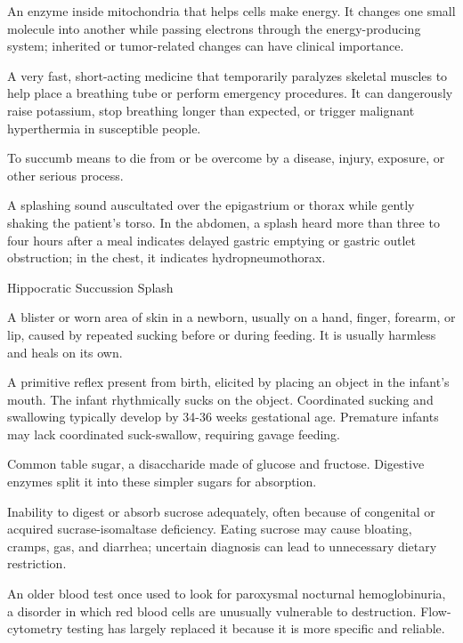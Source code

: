  An enzyme inside mitochondria that helps cells make energy. It changes one small molecule into another while passing electrons through the energy-producing system; inherited or tumor-related changes can have clinical importance.

 A very fast, short-acting medicine that temporarily paralyzes skeletal muscles to help place a breathing tube or perform emergency procedures. It can dangerously raise potassium, stop breathing longer than expected, or trigger malignant hyperthermia in susceptible people.

 To succumb means to die from or be overcome by a disease, injury, exposure, or other serious process.

 A splashing sound auscultated over the epigastrium or thorax while gently shaking the patient's torso. In the abdomen, a splash heard more than three to four hours after a meal indicates delayed gastric emptying or gastric outlet obstruction; in the chest, it indicates hydropneumothorax.

\synonyms
Hippocratic Succussion Splash

 A blister or worn area of skin in a newborn, usually on a hand, finger, forearm, or lip, caused by
repeated sucking before or during feeding. It is usually harmless and heals on its own.

 A primitive reflex present from birth, elicited by placing an object in the infant's
mouth. The infant rhythmically sucks on the object. Coordinated sucking and swallowing
typically develop by 34-36 weeks gestational age. Premature infants may lack coordinated
suck-swallow, requiring gavage feeding.

 Common table sugar, a disaccharide made of glucose and fructose. Digestive enzymes split it into these simpler sugars for absorption.

 Inability to digest or absorb sucrose adequately, often because of congenital or acquired sucrase-isomaltase deficiency. Eating sucrose may cause bloating, cramps, gas, and diarrhea; uncertain diagnosis can lead to unnecessary dietary restriction.

 An older blood test once used to look for paroxysmal nocturnal hemoglobinuria, a disorder in which red blood cells are unusually vulnerable to destruction. Flow-cytometry testing has largely replaced it because it is more specific and reliable.

